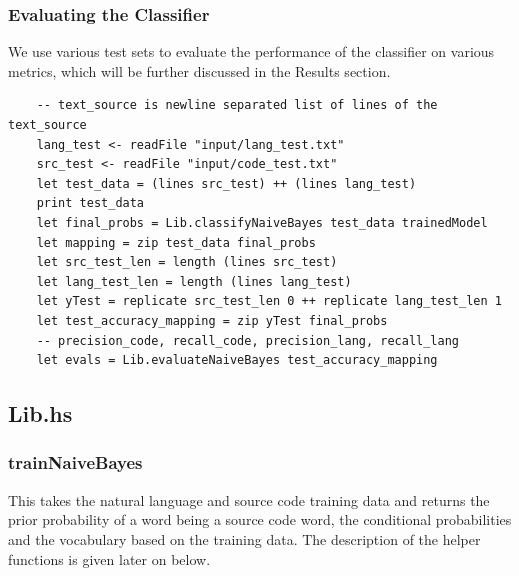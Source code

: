 \documentclass[12pt]{scrreprt}
\begin{document}
\subsubsection{Evaluating the Classifier}

We use various test sets to evaluate the performance of the classifier on various metrics, which will be further discussed in the Results section. 

\begin{verbatim}
    -- text_source is newline separated list of lines of the text_source
    lang_test <- readFile "input/lang_test.txt"
    src_test <- readFile "input/code_test.txt"
    let test_data = (lines src_test) ++ (lines lang_test)
    print test_data
    let final_probs = Lib.classifyNaiveBayes test_data trainedModel
    let mapping = zip test_data final_probs
    let src_test_len = length (lines src_test)
    let lang_test_len = length (lines lang_test)
    let yTest = replicate src_test_len 0 ++ replicate lang_test_len 1
    let test_accuracy_mapping = zip yTest final_probs
    -- precision_code, recall_code, precision_lang, recall_lang
    let evals = Lib.evaluateNaiveBayes test_accuracy_mapping
   \end{verbatim}
   



\subsection{Lib.hs}

\subsubsection{trainNaiveBayes}

This takes the natural language and source code training data and returns the prior probability of a word being a source code word, the conditional probabilities and the vocabulary based on the training data. The description of the helper functions is given later on below. 
\end{document}
